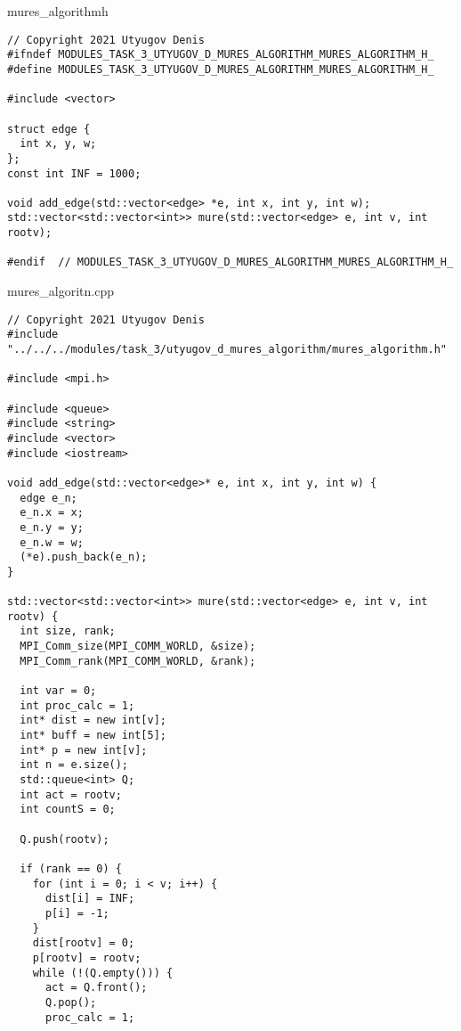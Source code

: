 \documentclass{report}
\begin{document}
mures\_algorithmh
\begin{lstlisting}
// Copyright 2021 Utyugov Denis
#ifndef MODULES_TASK_3_UTYUGOV_D_MURES_ALGORITHM_MURES_ALGORITHM_H_
#define MODULES_TASK_3_UTYUGOV_D_MURES_ALGORITHM_MURES_ALGORITHM_H_

#include <vector>

struct edge {
  int x, y, w;
};
const int INF = 1000;

void add_edge(std::vector<edge> *e, int x, int y, int w);
std::vector<std::vector<int>> mure(std::vector<edge> e, int v, int rootv);

#endif  // MODULES_TASK_3_UTYUGOV_D_MURES_ALGORITHM_MURES_ALGORITHM_H_

\end{lstlisting}
mures\_algoritn.cpp
\begin{lstlisting}
// Copyright 2021 Utyugov Denis
#include "../../../modules/task_3/utyugov_d_mures_algorithm/mures_algorithm.h"

#include <mpi.h>

#include <queue>
#include <string>
#include <vector>
#include <iostream>

void add_edge(std::vector<edge>* e, int x, int y, int w) {
  edge e_n;
  e_n.x = x;
  e_n.y = y;
  e_n.w = w;
  (*e).push_back(e_n);
}

std::vector<std::vector<int>> mure(std::vector<edge> e, int v, int rootv) {
  int size, rank;
  MPI_Comm_size(MPI_COMM_WORLD, &size);
  MPI_Comm_rank(MPI_COMM_WORLD, &rank);

  int var = 0;
  int proc_calc = 1;
  int* dist = new int[v];
  int* buff = new int[5];
  int* p = new int[v];
  int n = e.size();
  std::queue<int> Q;
  int act = rootv;
  int countS = 0;

  Q.push(rootv);

  if (rank == 0) {
    for (int i = 0; i < v; i++) {
      dist[i] = INF;
      p[i] = -1;
    }
    dist[rootv] = 0;
    p[rootv] = rootv;
    while (!(Q.empty())) {
      act = Q.front();
      Q.pop();
      proc_calc = 1;


\end{lstlisting}
\end{document}
